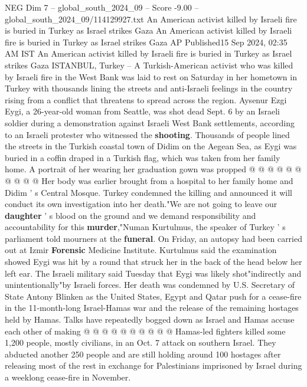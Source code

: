 \begin{textsample}{NEG Dim 7 – global\_south\_2024\_09 – Score -9.00 – global\_south\_2024\_09/114129927.txt}  \label{ex:f7_neg_172}
An American activist killed by Israeli fire is buried in Turkey as Israel strikes Gaza An American activist killed by Israeli fire is buried in Turkey as Israel strikes Gaza AP Published15 Sep 2024, 02:35 AM IST An American activist killed by Israeli fire is buried in Turkey as Israel strikes Gaza ISTANBUL, Turkey -- A Turkish-American activist who was killed by Israeli fire in the West Bank was laid to rest on Saturday in her hometown in Turkey with thousands lining the streets and anti-Israeli feelings in the country rising from a conflict that threatens to spread across the region.
Aysenur Ezgi Eygi, a 26-year-old woman from Seattle, was shot dead Sept. 6 by an Israeli soldier during a demonstration against Israeli West Bank settlements, according to an Israeli protester who witnessed the \textbf{shooting}.
Thousands of people lined the streets in the Turkish coastal town of Didim on the Aegean Sea, as Eygi was buried in a coffin draped in a Turkish flag, which was taken from her family home.
A portrait of her wearing her graduation gown was propped @ @ @ @ @ @ @ @ @ @ Her body was earlier brought from a hospital to her family home and Didim ' s Central Mosque.
Turkey condemned the killing and announced it will conduct its own investigation into her death."We are not going to leave our \textbf{daughter} ' s blood on the ground and we demand responsibility and accountability for this \textbf{murder},"Numan Kurtulmus, the speaker of Turkey ' s parliament told mourners at the \textbf{funeral}.
On Friday, an autopsy had been carried out at Izmir \textbf{Forensic} Medicine Institute.
Kurtulmus said the examination showed Eygi was hit by a round that struck her in the back of the head below her left ear.
The Israeli military said Tuesday that Eygi was likely shot"indirectly and unintentionally"by Israeli forces.
Her death was condemned by U.S.
Secretary of State Antony Blinken as the United States, Egypt and Qatar push for a cease-fire in the 11-month-long Israel-Hamas war and the release of the remaining hostages held by Hamas.
Talks have repeatedly bogged down as Israel and Hamas accuse each other of making @ @ @ @ @ @ @ @ @ @ Hamas-led fighters killed some 1,200 people, mostly civilians, in an Oct. 7 attack on southern Israel.
They abducted another 250 people and are still holding around 100 hostages after releasing most of the rest in exchange for Palestinians imprisoned by Israel during a weeklong cease-fire in November.

\end{textsample}
